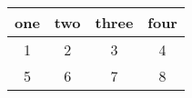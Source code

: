 \begin{table}[htp]
    \centering
    \begin{tabular}{ c  c  c  c }
        \hline
        one &  two &  three &  four \\ 
        \hline
        1 & 2 & 3 & 4 \\
	5 & 6 & 7 & 8 \\
        \hline
    \end{tabular}
\end{table}